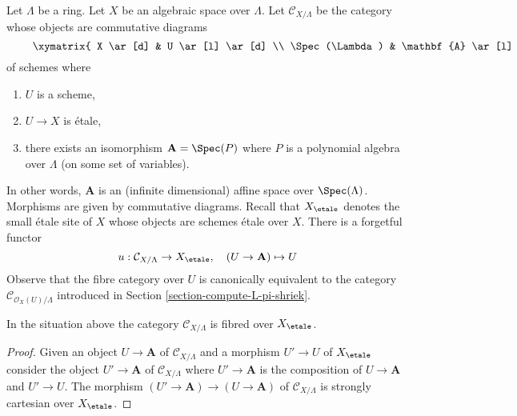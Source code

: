 \medskip\noindent
Let $\Lambda$ be a ring. Let $X$ be an algebraic space over $\Lambda$.
Let $\mathcal{C}_{X/\Lambda}$ be the category whose objects are
commutative diagrams
\begin{equation}
\label{equation-object-space}
\vcenter{
\xymatrix{
X \ar[d] & U \ar[l] \ar[d] \\
\Spec(\Lambda) & \mathbf{A} \ar[l]
}
}
\end{equation}
of schemes where
\begin{enumerate}
\item $U$ is a scheme,
\item $U \to X$ is \'etale,
\item there exists an isomorphism $\mathbf{A} = \Spec(P)$
where $P$ is a polynomial algebra over $\Lambda$ (on some set
of variables).
\end{enumerate}
In other words, $\mathbf{A}$ is an (infinite dimensional) affine space over
$\Spec(\Lambda)$. Morphisms are given by commutative diagrams.
Recall that $X_\etale$ denotes the small \'etale site of $X$
whose objects are schemes \'etale over $X$.
There is a forgetful functor
$$
u : \mathcal{C}_{X/\Lambda} \to X_\etale,
\quad
(U \to \mathbf{A}) \mapsto U
$$
Observe that the fibre category over $U$ is canonically equivalent
to the category $\mathcal{C}_{\mathcal{O}_X(U)/\Lambda}$ introduced
in Section \ref{section-compute-L-pi-shriek}.

\begin{lemma}
\label{lemma-category-fibred-space}
In the situation above the category
$\mathcal{C}_{X/\Lambda}$ is fibred over $X_\etale$.
\end{lemma}

\begin{proof}
Given an object $U \to \mathbf{A}$ of $\mathcal{C}_{X/\Lambda}$ and a morphism
$U' \to U$ of $X_\etale$ consider the object $U' \to \mathbf{A}$ of
$\mathcal{C}_{X/\Lambda}$ where $U' \to \mathbf{A}$ is the composition of
$U \to \mathbf{A}$
and $U' \to U$. The morphism $(U' \to \mathbf{A}) \to (U \to \mathbf{A})$ of
$\mathcal{C}_{X/\Lambda}$ is strongly cartesian over $X_\etale$.
\end{proof}

